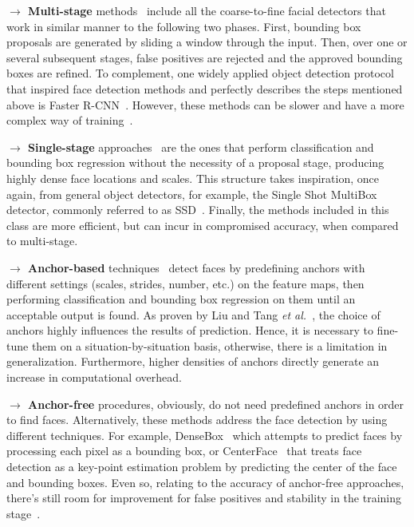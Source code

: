 \documentclass[class=report, crop=false, a4paper, 12pt]{standalone}
\begin{document}
\noindent\textbf{$\rightarrow$ Multi-stage} methods~\autocite{dengRetinaFaceSinglestageDense2019} include all the coarse-to-fine facial detectors that work in similar manner to the following two phases. First, bounding box proposals are generated by sliding a window through the input. Then, over one or several subsequent stages, false positives are rejected and the approved bounding boxes are refined. To complement, one widely applied object detection protocol that inspired face detection methods and perfectly describes the steps mentioned above is Faster R-CNN~\autocite{renFasterRCNNRealTime2016}. However, these methods can be slower and have a more complex way of training~\autocite{xuCenterFaceJointFace2019}.

\vspace{0.7\baselineskip}
\noindent\textbf{$\rightarrow$ Single-stage} approaches~\autocite{dengRetinaFaceSinglestageDense2019} are the ones that perform classification and bounding box regression without the necessity of a proposal stage, producing highly dense face locations and scales. This structure takes inspiration, once again, from general object detectors, for example, the Single Shot MultiBox detector, commonly referred to as SSD~\autocite{liuSSDSingleShot2016}. Finally, the methods included in this class are more efficient, but can incur in compromised accuracy, when compared to multi-stage.

\vspace{0.7\baselineskip}
\noindent\textbf{$\rightarrow$ Anchor-based} techniques~\autocite{liuHAMBoxDelvingOnline2019, dengRetinaFaceSinglestageDense2019, zhangFaceDetectionUsing2018} detect faces by predefining anchors with different settings (scales, strides, number, etc.) on the feature maps, then performing classification and bounding box regression on them until an acceptable output is found. As proven by Liu and Tang \textit{et al.}~\autocite{liuHAMBoxDelvingOnline2019}, the choice of anchors highly influences the results of prediction. Hence, it is necessary to fine-tune them on a situation-by-situation basis, otherwise, there is a limitation in generalization. Furthermore, higher densities of anchors directly generate an increase in computational overhead.

\vspace{0.7\baselineskip}
\noindent\textbf{$\rightarrow$ Anchor-free} procedures, obviously, do not need predefined anchors in order to find faces. Alternatively, these methods address the face detection by using different techniques. For example, DenseBox~\autocite{huangDenseBoxUnifyingLandmark2015} which attempts to predict faces by processing each pixel as a bounding box, or CenterFace~\autocite{xuCenterFaceJointFace2019} that treats face detection as a key-point estimation problem by predicting the center of the face and bounding boxes. Even so, relating to the accuracy of anchor-free approaches, there's still room for improvement for false positives and stability in the training stage~\autocite{duElementsEndtoendDeep2022}.
\end{document}
